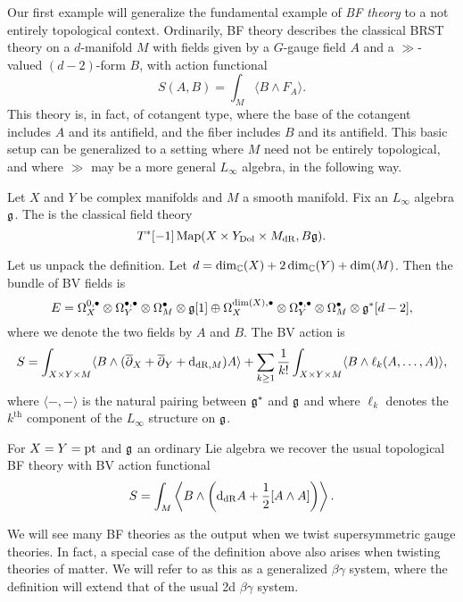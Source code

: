 \documentclass[10pt, oneside]{article}
\begin{document}
Our first example will generalize the fundamental example of \emph{BF theory} to a not entirely topological context.  Ordinarily, BF theory describes the classical BRST theory on a $d$-manifold $M$ with fields given by a $G$-gauge field $A$ and a $\gg$-valued $(d-2)$-form $B$, with action functional
\[S(A,B) = \int_M \langle B \wedge F_A \rangle.\]
This theory is, in fact, of cotangent type, where the base of the cotangent includes $A$ and its antifield, and the fiber includes $B$ and its antifield.  This basic setup can be generalized to a setting where $M$ need not be entirely topological, and where $\gg$ may be a more general $L_\infty$ algebra, in the following way.

\begin{definition}
Let $X$ and $Y$ be complex manifolds and $M$ a smooth manifold. Fix an $L_\infty$ algebra $\mathfrak g$. The  is the classical field theory
\[T^*[-1]\operatorname{Map}(X\times Y_{\mathrm{Dol}}\times M_{\mathrm{dR}}, B\mathfrak g).\]
\label{def:generalizedBF}
\end{definition}

Let us unpack the definition. Let $d = \dim_\mathbb C(X) + 2\dim_\mathbb C(Y) + \dim(M)$. Then the bundle of BV fields is
\[E = \Omega^{0,\bullet}_X \otimes \Omega^{\bullet,\bullet}_Y \otimes \Omega^\bullet_M \otimes \mathfrak g[1]\oplus \Omega^{\dim(X),\bullet}_X \otimes \Omega^{\bullet,\bullet}_Y \otimes \Omega^\bullet_M\otimes \mathfrak g^*[d-2],\]
where we denote the two fields by $A$ and $B$. The BV action is
\[S = \int_{X\times Y\times M} \langle B\wedge (\overline{\partial}_X + \overline{\partial}_Y + {\rm d}_{\mathrm{dR}, M}) A\rangle + \sum_{k\geq 1}\frac{1}{k!} \int_{X\times Y\times M} \langle B\wedge \ell_k(A, \dots, A)\rangle,\]
where $\langle -, -\rangle$ is the natural pairing between $\mathfrak g^*$ and $\mathfrak g$ and where $\ell_k$ denotes the $k^{\text{th}}$ component of the $L_\infty$ structure on $\mathfrak g$.

\begin{example}
For $X=Y=\operatorname{pt}$ and $\mathfrak g$ an ordinary Lie algebra we recover the usual topological BF theory with BV action functional
\[S = \int_M \left\langle B\wedge \left({\rm d}_{\mathrm{dR}} A+ \frac{1}{2}[A\wedge A]\right)\right\rangle.\]
\end{example}

We will see many BF theories as the output when we twist supersymmetric gauge theories.
In fact, a special case of the definition above also arises when twisting theories of matter.  We will refer to as this as a generalized $\beta\gamma$ system, where the definition will extend that of the usual 2d $\beta \gamma$ system. 
\end{document}
